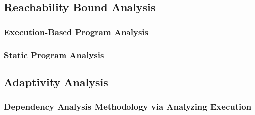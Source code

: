 
\subsection{Reachability Bound Analysis}
\label{sec:intro-methodology-reachability}
\subsubsection{Execution-Based Program Analysis}

\subsubsection{Static Program Analysis}
\subsection{Adaptivity Analysis}
\label{sec:intro-methodology-adapt}
\subsubsection{Dependency Analysis Methodology via Analyzing Execution}
